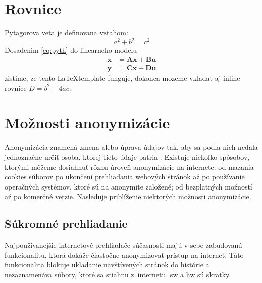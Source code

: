 \section{Rovnice}
Pytagorova veta je definovana vztahom:
\begin{equation}
	a^2 + b^2 = c^2
	\label{eq:pyth}
\end{equation}
Dosadenim \eqref{eq:pyth} do linearneho modelu
\begin{align}
	\dot{\mathbf{x}} &= \mathbf{A} \mathbf{x} + \mathbf{B} \mathbf{u} \\
	\mathbf{y} &= \mathbf{C} \mathbf{x} + \mathbf{D} \mathbf{u}
	\label{eq:model}
\end{align}
zistime, ze tento \LaTeX template funguje, dokonca mozeme vkladat aj inline rovnice $D = b^2 - 4ac$.


\section{Možnosti anonymizácie}
\noindent Anonymizácia znamená zmena alebo úprava údajov tak, aby sa podľa nich nedala jednoznačne určiť osoba, ktorej tieto údaje patria \cite{t01}. Existuje niekoľko spôsobov, ktorými môžeme dosiahnuť rôznu úroveň anonymizácie na internete: od mazania cookies súborov po ukončení prehliadania webových stránok až po používanie operačných systémov, ktoré sú na anonymite založené; od bezplatných možností až po komerčné verzie.
\newline Nasleduje priblíženie niektorých možnosti anonymizácie.

\subsection{Súkromné prehliadanie}
\noindent Najpoužívanejšie internetové prehliadače súčasnosti majú v sebe zabudovanú funkcionalitu, ktorá dokáže čiastočne anonymizovať prístup na internet. Táto funkcionalita blokuje ukladanie navštívených stránok do histórie a nezaznamenáva súbory, ktoré sa stiahnu z~internetu. sw a hw sú skratky.

